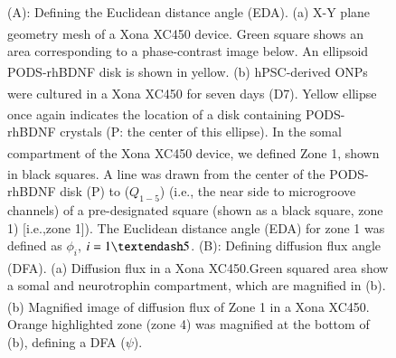 \documentclass[review]{elsarticle}
\begin{document}
\begin{figure}
	\caption{(A): Defining the Euclidean distance angle (EDA). (a) X-Y plane geometry mesh of a Xona\textsuperscript{\texttrademark} XC450 device. Green square shows an area corresponding to a phase-contrast image below. An ellipsoid PODS\textsuperscript{\textregistered}-rhBDNF disk is shown in yellow. (b) hPSC-derived ONPs were cultured in a Xona\textsuperscript{\texttrademark} XC450 for seven days (D7). Yellow ellipse once again indicates the location of a disk containing PODS\textsuperscript{\textregistered}-rhBDNF crystals (P: the center of this ellipse). In the somal compartment of the Xona\textsuperscript{\texttrademark} XC450 device, we defined Zone 1, shown in black squares. A line was drawn from the center of the PODS\textsuperscript{\textregistered}-rhBDNF disk (P) to ($Q_{1-5}$) (i.e., the near side to microgroove channels) of a pre-designated square (shown as a black square, zone 1) [i.e.,zone 1]). The Euclidean distance angle (EDA) for zone 1 was defined as $\phi_{i}$, $i = 1\textendash 5$. (B): Defining diffusion flux angle (DFA). (a) Diffusion flux in a Xona\textsuperscript{\texttrademark} XC450.Green squared area show a somal and neurotrophin compartment, which are magnified in (b). (b) Magnified image of diffusion flux of Zone 1 in a Xona\textsuperscript{\texttrademark} XC450. Orange highlighted zone (zone 4) was magnified at the bottom of (b), defining a DFA ($\psi$).}
\end{figure}
\end{document}

